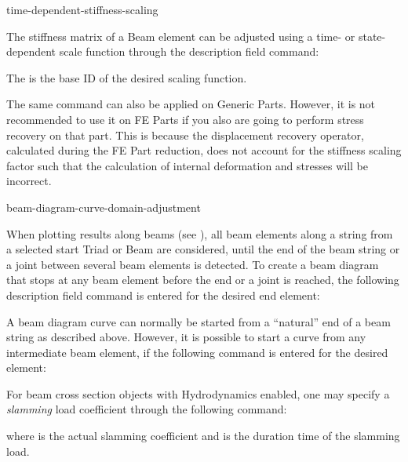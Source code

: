            {time-dependent-stiffness-scaling}

The stiffness matrix of a Beam element can be adjusted using a time- or
state-dependent scale function through the description field command:


\noindent
The {\tt{}} is the base ID of the desired scaling function.

The same command can also be applied on Generic Parts. However, it is not
recommended to use it on FE Parts if you also are going to perform stress
recovery on that part. This is because the displacement recovery operator,
calculated during the FE Part reduction, does not account for the stiffness
scaling factor such that the calculation of internal deformation and stresses
will be incorrect.


           {beam-diagram-curve-domain-adjustment}

When plotting results along beams
(see ), all beam elements
along a string from a selected start Triad or Beam are considered, until the
end of the beam string or a joint between several beam elements is detected.
To create a beam diagram that stops at any beam element before the end
or a joint is reached, the following description field command is entered
for the desired end element:


\noindent
A beam diagram curve can normally be started from a ``natural'' end of a beam
string as described above. However, it is possible to start a curve from any
intermediate beam element, if the following command is entered
for the desired element:




For beam cross section objects with Hydrodynamics enabled, one may specify a
{\sl slamming} load coefficient through the following command:


\noindent
where {\tt{}} is the actual slamming coefficient and
{\tt{}} is the duration time of the slamming load.


